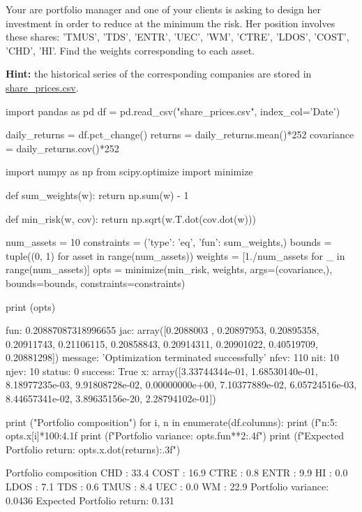 \begin{question}
Your are portfolio manager and one of your clients is asking to design her investment in order to reduce at the minimum the risk. Her position involves these shares: 'TMUS', 'TDS', 'ENTR', 'UEC', 'WM', 'CTRE', 'LDOS', 'COST', 'CHD', 'HI'.
Find the weights corresponding to each asset.

\noindent\textbf{Hint:} the historical series of the corresponding companies are stored in \href{https://github.com/matteosan1/finance_course/raw/master/input_files/share_price.csv}{share\_prices.csv}.

\end{question}

\cprotEnv \begin{solution}
\begin{ipython}
import pandas as pd
df = pd.read_csv("share_prices.csv", index_col='Date')

daily_returns = df.pct_change()
returns = daily_returns.mean()*252
covariance = daily_returns.cov()*252
\end{ipython}
\begin{ipython}
import numpy as np
from scipy.optimize import minimize

def sum_weights(w):
    return np.sum(w) - 1

def min_risk(w, cov):
    return np.sqrt(w.T.dot(cov.dot(w)))

num_assets = 10
constraints = ({'type': 'eq', 'fun': sum_weights},)
bounds = tuple((0, 1) for asset in range(num_assets))
weights = [1./num_assets for _ in range(num_assets)]
opts = minimize(min_risk, weights, args=(covariance,),
                bounds=bounds, constraints=constraints)

print (opts)
\end{ipython}
\begin{ioutput}
     fun: 0.20887087318996655
     jac: array([0.2088003 , 0.20897953, 0.20895358, 0.20911743, 0.21106115,
                 0.20858843, 0.20914311, 0.20901022, 0.40519709, 0.20881298])
 message: 'Optimization terminated successfully'
    nfev: 110
     nit: 10
    njev: 10
  status: 0
 success: True
       x: array([3.33744344e-01, 1.68530140e-01, 8.18977235e-03, 9.91808728e-02,
                 0.00000000e+00, 7.10377889e-02, 6.05724516e-03, 8.44657341e-02,
                 3.89635156e-20, 2.28794102e-01])
\end{ioutput}
\begin{ipython}
print ("Portfolio composition")
for i, n in enumerate(df.columns):
    print (f"{n:5}: {opts.x[i]*100:4.1f}%
print (f"Portfolio variance: {opts.fun**2:.4f}")
print (f"Expected Portfolio return: {opts.x.dot(returns):.3f}")
\end{ipython}
\begin{ioutput}
Portfolio composition
CHD  : 33.4%
COST : 16.9%
CTRE :  0.8%
ENTR :  9.9%
HI   :  0.0%
LDOS :  7.1%
TDS  :  0.6%
TMUS :  8.4%
UEC  :  0.0%
WM   : 22.9%
Portfolio variance: 0.0436
Expected Portfolio return: 0.131
\end{ioutput}
\end{solution}

